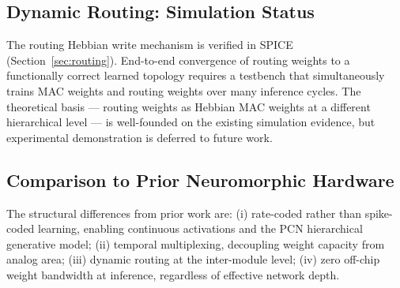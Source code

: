 \documentclass[journal,10pt,twoside]{IEEEtran}
\begin{document}
\subsection{Dynamic Routing: Simulation Status}

The routing Hebbian write mechanism is verified in SPICE
(Section~\ref{sec:routing}).
End-to-end convergence of routing weights to a functionally correct learned
topology requires a testbench that simultaneously trains MAC weights and
routing weights over many inference cycles.
The theoretical basis — routing weights as Hebbian MAC weights at a different
hierarchical level — is well-founded on the existing simulation evidence,
but experimental demonstration is deferred to future work.

\subsection{Comparison to Prior Neuromorphic Hardware}

\begin{table}[t]
\caption{Comparison to prior neuromorphic hardware}
\label{tab:prior_work}
\centering
\footnotesize
{}
\end{table}

The structural differences from prior work are:
(i) rate-coded rather than spike-coded learning, enabling continuous
activations and the PCN hierarchical generative model;
(ii) temporal multiplexing, decoupling weight capacity from analog area;
(iii) dynamic routing at the inter-module level;
(iv) zero off-chip weight bandwidth at inference, regardless of effective
network depth.
\end{document}
